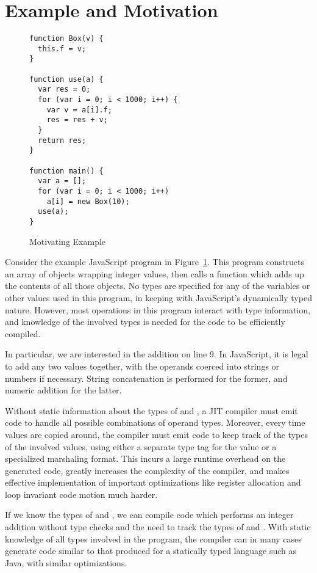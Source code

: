
\section{Example and Motivation}
\label{sec:example}

\begin{figure}
\begin{lstlisting}[xleftmargin=18pt]
function Box(v) {
  this.f = v;
}

function use(a) {
  var res = 0;
  for (var i = 0; i < 1000; i++) {
    var v = a[i].f;
    res = res + v;
  }
  return res;
}

function main() {
  var a = [];
  for (var i = 0; i < 1000; i++)
    a[i] = new Box(10);
  use(a);
}
\end{lstlisting}
\caption{Motivating Example}
\label{fig:motivating-example}
\end{figure}

Consider the example JavaScript program in Figure~\ref{fig:motivating-example}.
This program constructs an array of  objects wrapping integer
values, then calls a  function which adds up the contents of all
those  objects.
No types are specified for any of the variables or other values used
in this program, in keeping with JavaScript's dynamically typed nature.
However, most operations in this program interact with type information,
and knowledge of the involved types is needed for the code to
be efficiently compiled.

In particular, we are interested in the addition
 on line 9.
In JavaScript, it is legal to add any two values together, with the
operands coerced into strings or numbers if necessary. String
concatenation is performed for the former, and numeric addition for the latter.

Without static information about the types of  and ,
a JIT compiler must emit code to handle all possible combinations of
operand types.
Moreover, every time values are copied around, the compiler must emit
code to keep track of the types of the involved values, using either
a separate type tag for the value or a specialized marshaling format.
This incurs a large runtime overhead on the generated code,
greatly increases the complexity of the compiler,
and makes effective implementation of important optimizations like
register allocation and loop invariant code motion much harder.

If we know the types of  and , we can compile
code which performs an integer addition without type checks and the need
to track the types of  and .
With static knowledge of all types involved in the program, the compiler can
in many cases generate code similar to that produced for a statically
typed language such as Java, with similar optimizations.

